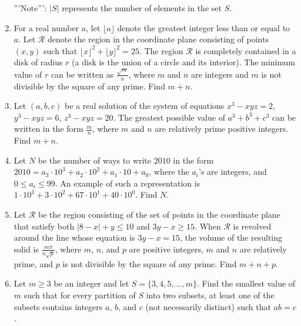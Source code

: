\documentclass{article}
\begin{document}
\begin{enumerate}[label=\arabic*., itemsep=0.5em]
'''Note''': \(|S|\) represents the number of elements in the set \(S\).\par \vspace{0.5em}\item For a real number \(a\), let \(\lfloor a \rfloor\) denote the greatest integer less than or equal to \(a\). Let \(\mathcal{R}\) denote the region in the coordinate plane consisting of points \((x,y)\) such that \(\lfloor x \rfloor ^2 + \lfloor y \rfloor ^2 = 25\). The region \(\mathcal{R}\) is completely contained in a disk of radius \(r\) (a disk is the union of a circle and its interior). The minimum value of \(r\) can be written as \(\frac {\sqrt {m}}{n}\), where \(m\) and \(n\) are integers and \(m\) is not divisible by the square of any prime. Find \(m + n\).\par \vspace{0.5em}\item Let \((a,b,c)\) be a real solution of the system of equations \(x^3 - xyz = 2\), \(y^3 - xyz = 6\), \(z^3 - xyz = 20\). The greatest possible value of \(a^3 + b^3 + c^3\) can be written in the form \(\frac {m}{n}\), where \(m\) and \(n\) are relatively prime positive integers. Find \(m + n\).\par \vspace{0.5em}\item Let \(N\) be the number of ways to write \(2010\) in the form \(2010 = a_3 \cdot 10^3 + a_2 \cdot 10^2 + a_1 \cdot 10 + a_0\), where the \(a_i\)'s are integers, and \(0 \le a_i \le 99\). An example of such a representation is \(1\cdot 10^3 + 3\cdot 10^2 + 67\cdot 10^1 + 40\cdot 10^0\). Find \(N\).\par \vspace{0.5em}\item Let \(\mathcal{R}\) be the region consisting of the set of points in the coordinate plane that satisfy both \(|8 - x| + y \le 10\) and \(3y - x \ge 15\). When \(\mathcal{R}\) is revolved around the line whose equation is \(3y - x = 15\), the volume of the resulting solid is \(\frac {m\pi}{n\sqrt {p}}\), where \(m\), \(n\), and \(p\) are positive integers, \(m\) and \(n\) are relatively prime, and \(p\) is not divisible by the square of any prime. Find \(m + n + p\).\par \vspace{0.5em}\item Let \(m \ge 3\) be an integer and let \(S = \{3,4,5,\ldots,m\}\). Find the smallest value of \(m\) such that for every partition of \(S\) into two subsets, at least one of the subsets contains integers \(a\), \(b\), and \(c\) (not necessarily distinct) such that \(ab = c\).


\end{enumerate}
\end{document}
